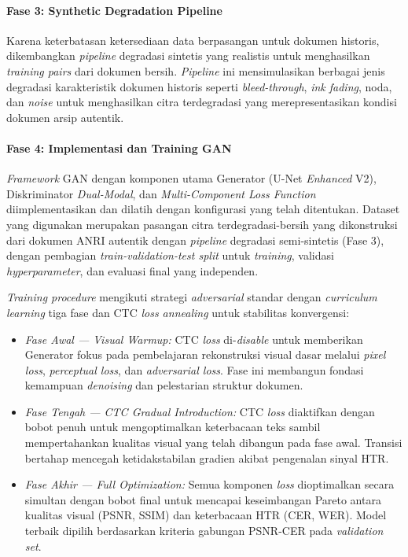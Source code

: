 \documentclass[12pt,a4paper]{book}
\begin{document}
\paragraph{Fase 3: Synthetic Degradation Pipeline}
Karena keterbatasan ketersediaan data berpasangan untuk dokumen historis, dikembangkan \textit{pipeline} degradasi sintetis yang realistis untuk menghasilkan \textit{training pairs} dari dokumen bersih. \textit{Pipeline} ini mensimulasikan berbagai jenis degradasi karakteristik dokumen historis seperti \textit{bleed-through}, \textit{ink fading}, noda, dan \textit{noise} untuk menghasilkan citra terdegradasi yang merepresentasikan kondisi dokumen arsip autentik.

\paragraph{Fase 4: Implementasi dan Training GAN}
\textit{Framework} GAN dengan komponen utama Generator (U-Net \textit{Enhanced} V2), Diskriminator \textit{Dual-Modal}, dan \textit{Multi-Component Loss Function} diimplementasikan dan dilatih dengan konfigurasi yang telah ditentukan. Dataset yang digunakan merupakan pasangan citra terdegradasi-bersih yang dikonstruksi dari dokumen ANRI autentik dengan \textit{pipeline} degradasi semi-sintetis (Fase 3), dengan pembagian \textit{train-validation-test split} untuk \textit{training}, validasi \textit{hyperparameter}, dan evaluasi final yang independen.

\textit{Training procedure} mengikuti strategi \textit{adversarial} standar dengan \textit{curriculum learning} tiga fase dan CTC \textit{loss annealing} untuk stabilitas konvergensi:

\begin{itemize}[leftmargin=1.5cm, nosep]
\item \textit{Fase Awal --- Visual Warmup:} CTC \textit{loss} di-\textit{disable} untuk memberikan Generator fokus pada pembelajaran rekonstruksi visual dasar melalui \textit{pixel loss}, \textit{perceptual loss}, dan \textit{adversarial loss}. Fase ini membangun fondasi kemampuan \textit{denoising} dan pelestarian struktur dokumen.

\item \textit{Fase Tengah --- CTC \textit{Gradual Introduction}:} CTC \textit{loss} diaktifkan dengan bobot penuh untuk mengoptimalkan keterbacaan teks sambil mempertahankan kualitas visual yang telah dibangun pada fase awal. Transisi bertahap mencegah ketidakstabilan gradien akibat pengenalan sinyal HTR.

\item \textit{Fase Akhir --- \textit{Full Optimization}:} Semua komponen \textit{loss} dioptimalkan secara simultan dengan bobot final untuk mencapai keseimbangan Pareto antara kualitas visual (PSNR, SSIM) dan keterbacaan HTR (CER, WER). Model terbaik dipilih berdasarkan kriteria gabungan PSNR-CER pada \textit{validation set}.
\end{itemize}
\end{document}
